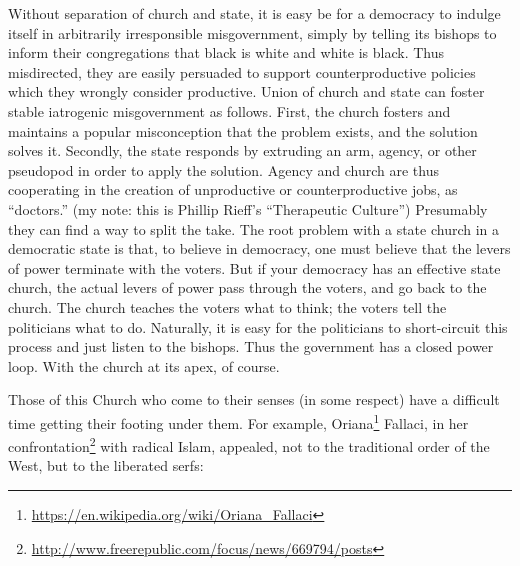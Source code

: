 \begin{quotex}
Without separation of church and state, it is easy be for a democracy to indulge itself in arbitrarily irresponsible misgovernment, simply by telling its bishops to inform their congregations that black is white and white is black. Thus misdirected, they are easily persuaded to support counterproductive policies which they wrongly consider productive. Union of church and state can foster stable iatrogenic misgovernment as follows. First, the church fosters and maintains a popular misconception that the problem exists, and the solution solves it. Secondly, the state responds by extruding an arm, agency, or other pseudopod in order to apply the solution. Agency and church are thus cooperating in the creation of unproductive or counterproductive jobs, as ``doctors.'' (my note: this is Phillip Rieff's ``Therapeutic Culture'') Presumably they can find a way to split the take. The root problem with a state church in a democratic state is that, to believe in democracy, one must believe that the levers of power terminate with the voters. But if your democracy has an effective state church, the actual levers of power pass through the voters, and go back to the church. The church teaches the voters what to think; the voters tell the politicians what to do. Naturally, it is easy for the politicians to short-circuit this process and just listen to the bishops. Thus the government has a closed power loop. With the church at its apex, of course.
\end{quotex}


Those of this Church who come to their senses (in some respect) have a difficult time getting their footing under them. For example, Oriana\footnote{\url{https://en.wikipedia.org/wiki/Oriana\_Fallaci}} Fallaci, in her confrontation\footnote{\url{http://www.freerepublic.com/focus/news/669794/posts}} with radical Islam, appealed, not to the traditional order of the West, but to the liberated serfs:

